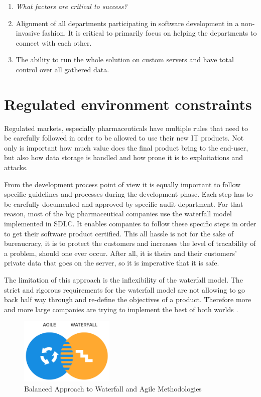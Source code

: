 \begin{enumerate}
	\item \emph{What factors are critical to success?	}
	\item[] Alignment of all departments participating in software development in a non-invasive fashion. It is critical to primarily focus on helping the departments to connect with each other.
	\item[] The ability to run the whole solution on custom servers and have total control over all gathered data.
	
\end{enumerate}


\section{Regulated environment constraints}

Regulated markets, especially pharmaceuticals have multiple rules that need to be carefully followed in order to be allowed to use their new IT products. Not only is important how much value does the final product bring to the end-user, but also how data storage is handled and how prone it is to exploitations and attacks. 

From the development process point of view it is equally important to follow specific guidelines and processes during the development phase. Each step has to be carefully documented and approved by specific audit department. For that reason, most of the big pharmaceutical companies use the waterfall model implemented in SDLC. It enables companies to follow these specific steps in order to get their software product certified. This all hassle is not for the sake of bureaucracy, it is to protect the customers and increases the level of tracability of a problem, should one ever occur. After all, it is theirs and their customers' private data that goes on the server, so it is imperative that it is safe.

The limitation of this approach is the inflexibility of the waterfall model. The strict and rigorous requirements for the waterfall model are not allowing to go back half way through and re-define the objectives of a product. Therefore more and more large companies are trying to implement the best of both worlds \cite{agile-waterfall}.

\begin{figure}[!ht]
	\centering
	\includegraphics[width=0.4\textwidth]{figures/agile-waterfall}
    \caption{Balanced Approach to Waterfall and Agile Methodologies}
\end{figure}

